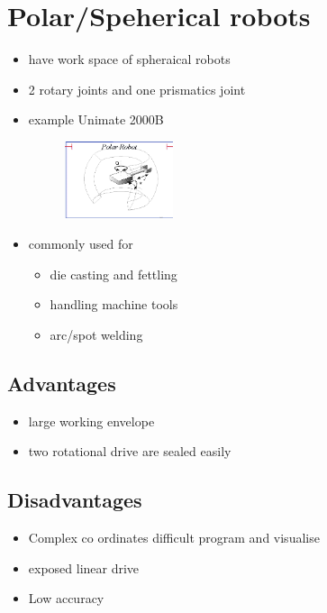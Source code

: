 \documentclass{article}
\begin{document}
\section{Polar/Speherical robots}
\begin{itemize}
	\item have work space of spheraical robots
	\item 2 rotary joints and one prismatics joint
	\item example Unimate 2000B
	      \begin{figure}[htpb]
		      \centering
		      \includegraphics[width=0.3\textwidth]{polarrobots.png}
		      \caption{}
		      \label{fig:}
	      \end{figure}
	\item commonly used for
	      \begin{itemize}
		      \item die casting and fettling
		      \item handling machine tools
		      \item arc/spot welding
	      \end{itemize}
\end{itemize}
\subsection{Advantages}
\begin{itemize}
	\item large working envelope
	\item two rotational drive are sealed easily
\end{itemize}
\subsection{Disadvantages}
\begin{itemize}
	\item Complex co ordinates difficult program and visualise
	\item exposed linear drive
	\item Low accuracy
\end{itemize}
\end{document}
